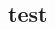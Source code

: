




	\title{\FormelsammlungTitel}
	\author{\FormelsammlungAutor}
	\date{\today}
	\begin{multicols}{3}
		\begin{minipage}{.4\paperheight}
			\maketitle
			\tableofcontents
		\end{minipage}
		\section{test}
	\end{multicols}

